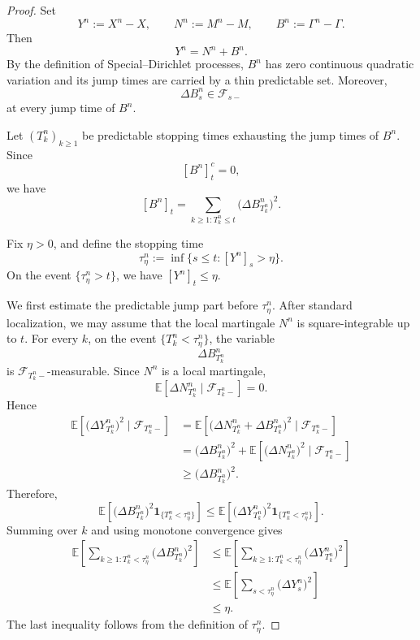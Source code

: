 \documentclass[a4paper,10pt]{article}
\begin{document}
\begin{proof}
Set
\[
        Y^n:=X^n-X,\qquad
        N^n:=M^n-M,\qquad
        B^n:=\Gamma^n-\Gamma .
\]
Then
\[
        Y^n=N^n+B^n .
\]
By the definition of Special--Dirichlet processes, \(B^n\) has zero
continuous quadratic variation and its jump times are carried by a thin
predictable set. Moreover,
\[
        \Delta B^n_s\in\mathcal F_{s-}
\]
at every jump time of \(B^n\).

Let \((T^n_k)_{k\ge1}\) be predictable stopping times exhausting the jump
times of \(B^n\). Since
\[
        [B^n]^c_t=0,
\]
we have
\[
        [B^n]_t
        =
        \sum_{k\ge1:T^n_k\le t}
        \bigl(\Delta B^n_{T^n_k}\bigr)^2 .
\]

Fix \(\eta>0\), and define the stopping time
\[
        \tau^n_\eta
        :=
        \inf\{s\le t:[Y^n]_s>\eta\}.
\]
On the event \(\{\tau^n_\eta>t\}\), we have \([Y^n]_t\le \eta\).

We first estimate the predictable jump part before \(\tau^n_\eta\). After
standard localization, we may assume that the local martingale \(N^n\) is
square-integrable up to \(t\). For every \(k\), on the event
\(\{T^n_k<\tau^n_\eta\}\), the variable
\[
        \Delta B^n_{T^n_k}
\]
is \(\mathcal F_{T^n_k-}\)-measurable. Since \(N^n\) is a local martingale,
\[
        \mathbb E\!\left[
        \Delta N^n_{T^n_k}
        \mid
        \mathcal F_{T^n_k-}
        \right]
        =0 .
\]
Hence
\[
\begin{aligned}
\mathbb E\!\left[
        \bigl(\Delta Y^n_{T^n_k}\bigr)^2
        \mid
        \mathcal F_{T^n_k-}
        \right]
&=
\mathbb E\!\left[
        \bigl(\Delta N^n_{T^n_k}
        +
        \Delta B^n_{T^n_k}\bigr)^2
        \mid
        \mathcal F_{T^n_k-}
        \right]
\\
&=
        \bigl(\Delta B^n_{T^n_k}\bigr)^2
        +
        \mathbb E\!\left[
        \bigl(\Delta N^n_{T^n_k}\bigr)^2
        \mid
        \mathcal F_{T^n_k-}
        \right]
\\
&\ge
        \bigl(\Delta B^n_{T^n_k}\bigr)^2 .
\end{aligned}
\]
Therefore,
\[
        \mathbb E\!\left[
        \bigl(\Delta B^n_{T^n_k}\bigr)^2
        \mathbf 1_{\{T^n_k<\tau^n_\eta\}}
        \right]
        \le
        \mathbb E\!\left[
        \bigl(\Delta Y^n_{T^n_k}\bigr)^2
        \mathbf 1_{\{T^n_k<\tau^n_\eta\}}
        \right].
\]
Summing over \(k\) and using monotone convergence gives
\[
\begin{aligned}
\mathbb E\!\left[
        \sum_{k\ge1:T^n_k<\tau^n_\eta}
        \bigl(\Delta B^n_{T^n_k}\bigr)^2
        \right]
&\le
\mathbb E\!\left[
        \sum_{k\ge1:T^n_k<\tau^n_\eta}
        \bigl(\Delta Y^n_{T^n_k}\bigr)^2
        \right]
\\
&\le
\mathbb E\!\left[
        \sum_{s<\tau^n_\eta}
        \bigl(\Delta Y^n_s\bigr)^2
        \right]
\\
&\le
\eta .
\end{aligned}
\]
The last inequality follows from the definition of \(\tau^n_\eta\).


\end{proof}
\end{document}
